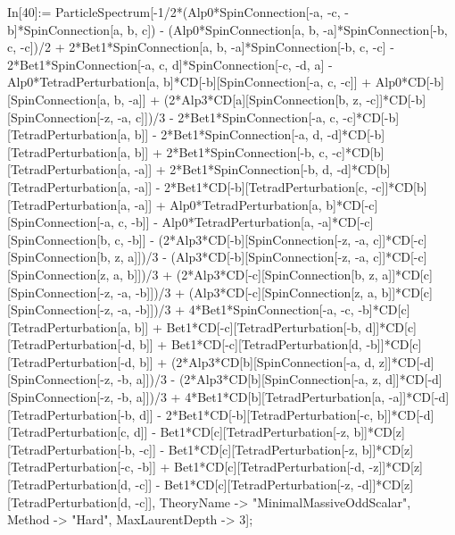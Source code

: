 In[40]:= ParticleSpectrum[-1/2*(Alp0*SpinConnection[-a, -c, -b]*SpinConnection[a, b, c]) - (Alp0*SpinConnection[a, b, -a]*SpinConnection[-b, c, -c])/2 + 2*Bet1*SpinConnection[a, b, -a]*SpinConnection[-b, c, -c] - 2*Bet1*SpinConnection[-a, c, d]*SpinConnection[-c, -d, a] - Alp0*TetradPerturbation[a, b]*CD[-b][SpinConnection[-a, c, -c]] + Alp0*CD[-b][SpinConnection[a, b, -a]] + (2*Alp3*CD[a][SpinConnection[b, z, -c]]*CD[-b][SpinConnection[-z, -a, c]])/3 - 2*Bet1*SpinConnection[-a, c, -c]*CD[-b][TetradPerturbation[a, b]] - 2*Bet1*SpinConnection[-a, d, -d]*CD[-b][TetradPerturbation[a, b]] + 2*Bet1*SpinConnection[-b, c, -c]*CD[b][TetradPerturbation[a, -a]] + 2*Bet1*SpinConnection[-b, d, -d]*CD[b][TetradPerturbation[a, -a]] - 2*Bet1*CD[-b][TetradPerturbation[c, -c]]*CD[b][TetradPerturbation[a, -a]] + Alp0*TetradPerturbation[a, b]*CD[-c][SpinConnection[-a, c, -b]] - Alp0*TetradPerturbation[a, -a]*CD[-c][SpinConnection[b, c, -b]] - (2*Alp3*CD[-b][SpinConnection[-z, -a, c]]*CD[-c][SpinConnection[b, z, a]])/3 - (Alp3*CD[-b][SpinConnection[-z, -a, c]]*CD[-c][SpinConnection[z, a, b]])/3 + (2*Alp3*CD[-c][SpinConnection[b, z, a]]*CD[c][SpinConnection[-z, -a, -b]])/3 + (Alp3*CD[-c][SpinConnection[z, a, b]]*CD[c][SpinConnection[-z, -a, -b]])/3 + 4*Bet1*SpinConnection[-a, -c, -b]*CD[c][TetradPerturbation[a, b]] + Bet1*CD[-c][TetradPerturbation[-b, d]]*CD[c][TetradPerturbation[-d, b]] + Bet1*CD[-c][TetradPerturbation[d, -b]]*CD[c][TetradPerturbation[-d, b]] + (2*Alp3*CD[b][SpinConnection[-a, d, z]]*CD[-d][SpinConnection[-z, -b, a]])/3 - (2*Alp3*CD[b][SpinConnection[-a, z, d]]*CD[-d][SpinConnection[-z, -b, a]])/3 + 4*Bet1*CD[b][TetradPerturbation[a, -a]]*CD[-d][TetradPerturbation[-b, d]] - 2*Bet1*CD[-b][TetradPerturbation[-c, b]]*CD[-d][TetradPerturbation[c, d]] - Bet1*CD[c][TetradPerturbation[-z, b]]*CD[z][TetradPerturbation[-b, -c]] - Bet1*CD[c][TetradPerturbation[-z, b]]*CD[z][TetradPerturbation[-c, -b]] + Bet1*CD[c][TetradPerturbation[-d, -z]]*CD[z][TetradPerturbation[d, -c]] - Bet1*CD[c][TetradPerturbation[-z, -d]]*CD[z][TetradPerturbation[d, -c]], TheoryName -> "MinimalMassiveOddScalar", Method -> "Hard", MaxLaurentDepth -> 3]; 